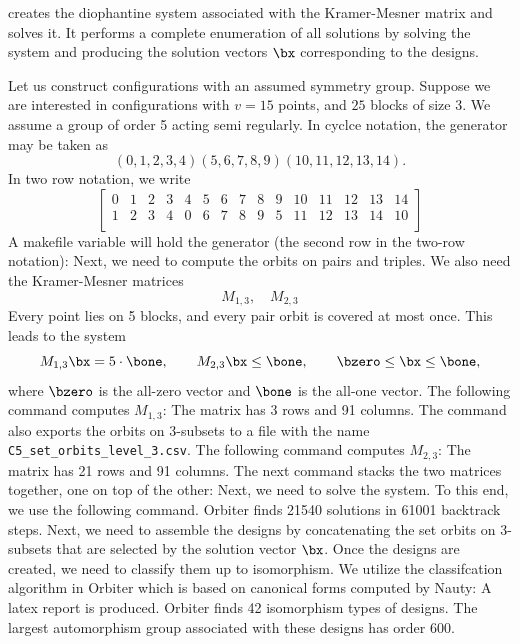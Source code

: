 
creates the diophantine system associated 
with the Kramer-Mesner matrix and solves it.
It performs a complete enumeration 
of all solutions by solving the system and producing 
the solution vectors $\bx$ 
corresponding to the designs. 


\bigskip

Let us construct configurations with an assumed symmetry group. 
Suppose we are interested in configurations with $v=15$ points, 
and $25$ blocks of size 3. 
We assume a group of order 5 acting semi regularly. In cyclce notation, 
the generator may be taken as 
$$
(0,1,2,3,4)(5,6,7,8,9)(10,11,12,13,14).
$$
In two row notation, we write
$$
\left[
\begin{array}{*{15}{c}}
0 & 1 & 2 & 3 & 4 & 5 & 6 & 7 & 8 & 9 & 10 & 11 & 12 & 13 & 14 \\
1 & 2 & 3 & 4 & 0 & 6 & 7 & 8 & 9 & 5 & 11 & 12 & 13 & 14 & 10 \\
\end{array}
\right]
$$
A makefile variable will hold the generator (the second row in the two-row notation):
Next, we need to compute the orbits on pairs and triples. 
We also need the Kramer-Mesner matrices 
$$
M_{1,3}, \quad M_{2,3}
$$
Every point lies on 5 blocks, and every pair orbit is covered at most once. 
This leads to the system
$$
M_{1,3} \bx = 5 \cdot \bone, \qquad M_{2,3} \bx \le \bone, \qquad \bzero \le \bx \le \bone,
$$
where $\bzero$ is the all-zero vector and $\bone$ is the all-one vector.
The following command computes $M_{1,3}$:
The matrix has 3 rows and 91 columns.
The command also exports the orbits on 3-subsets to a file with the name \verb'C5_set_orbits_level_3.csv'.
The following command computes $M_{2,3}$:
The matrix has 21 rows and 91 columns.
The next command stacks the two matrices together, one on top of the other:
Next, we need to solve the system. To this end, we use the following command.
Orbiter finds 21540 solutions in 61001 backtrack steps.
Next, we need to assemble the designs by concatenating the set orbits on 3-subsets 
that are selected by the solution vector $\bx$. 
Once the designs are created, we need to classify them up to isomorphism. 
We utilize the classifcation algorithm in Orbiter which is based on canonical forms 
computed by Nauty:
A latex report is produced.
Orbiter finds 42 isomorphism types of designs. 
The largest automorphism group associated with these designs has order 600.


